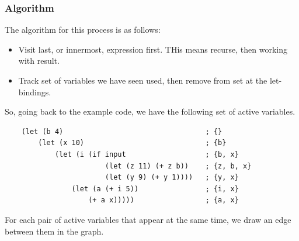 \documentclass[letterpaper]{article}
\begin{document}
\subsubsection{Algorithm}
The algorithm for this process is as follows: 
\begin{itemize}
    \item Visit last, or innermost, expression first. THis means recurse, then working with result. 
    \item Track set of variables we have seen used, then remove from set at the let-bindings.
\end{itemize}
So, going back to the example code, we have the following set of active variables.
\begin{verbatim}
    (let (b 4)                                  ; {}
        (let (x 10)                             ; {b}
            (let (i (if input                   ; {b, x}
                        (let (z 11) (+ z b))    ; {z, b, x}
                        (let (y 9) (+ y 1))))   ; {y, x}
                (let (a (+ i 5))                ; {i, x}
                    (+ a x)))))                 ; {a, x}\end{verbatim}
For each pair of active variables that appear at the same time, we draw an edge between them in the graph.
\end{document}
